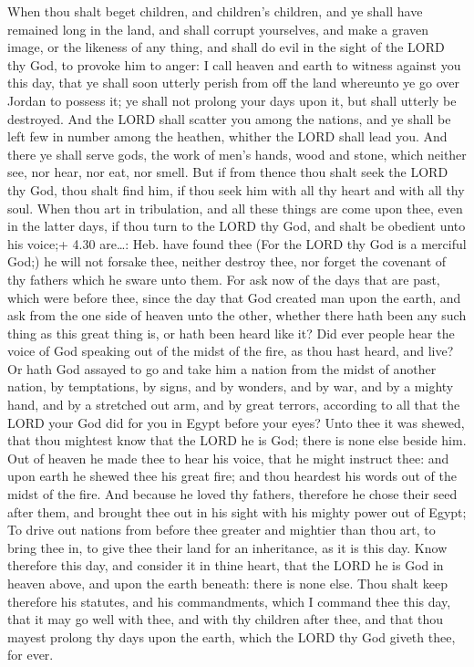  When thou shalt beget children, and children's children,
and ye shall have remained long in the land, and shall corrupt
yourselves, and make a graven image, or the likeness of any thing, and
shall do evil in the sight of the LORD thy God, to provoke him to anger:
 I call heaven and earth to witness against you this day,
that ye shall soon utterly perish from off the land whereunto ye go over
Jordan to possess it; ye shall not prolong your days upon it, but shall
utterly be destroyed.  And the LORD shall scatter you among
the nations, and ye shall be left few in number among the heathen,
whither the LORD shall lead you.  And there ye shall serve
gods, the work of men's hands, wood and stone, which neither see, nor
hear, nor eat, nor smell.  But if from thence thou shalt
seek the LORD thy God, thou shalt find him, if thou seek him with all
thy heart and with all thy soul.  When thou art in
tribulation, and all these things are come upon thee, even in the latter
days, if thou turn to the LORD thy God, and shalt be obedient unto his
voice;+ 4.30 are\ldots: Heb. have found thee  (For the LORD
thy God is a merciful God;) he will not forsake thee, neither destroy
thee, nor forget the covenant of thy fathers which he sware unto them.
 For ask now of the days that are past, which were before
thee, since the day that God created man upon the earth, and ask from
the one side of heaven unto the other, whether there hath been any such
thing as this great thing is, or hath been heard like it? 
Did ever people hear the voice of God speaking out of the midst of the
fire, as thou hast heard, and live?  Or hath God assayed to
go and take him a nation from the midst of another nation, by
temptations, by signs, and by wonders, and by war, and by a mighty hand,
and by a stretched out arm, and by great terrors, according to all that
the LORD your God did for you in Egypt before your eyes? 
Unto thee it was shewed, that thou mightest know that the LORD he is
God; there is none else beside him.  Out of heaven he made
thee to hear his voice, that he might instruct thee: and upon earth he
shewed thee his great fire; and thou heardest his words out of the midst
of the fire.  And because he loved thy fathers, therefore
he chose their seed after them, and brought thee out in his sight with
his mighty power out of Egypt;  To drive out nations from
before thee greater and mightier than thou art, to bring thee in, to
give thee their land for an inheritance, as it is this day.
 Know therefore this day, and consider it in thine heart,
that the LORD he is God in heaven above, and upon the earth beneath:
there is none else.  Thou shalt keep therefore his
statutes, and his commandments, which I command thee this day, that it
may go well with thee, and with thy children after thee, and that thou
mayest prolong thy days upon the earth, which the LORD thy God giveth
thee, for ever.

